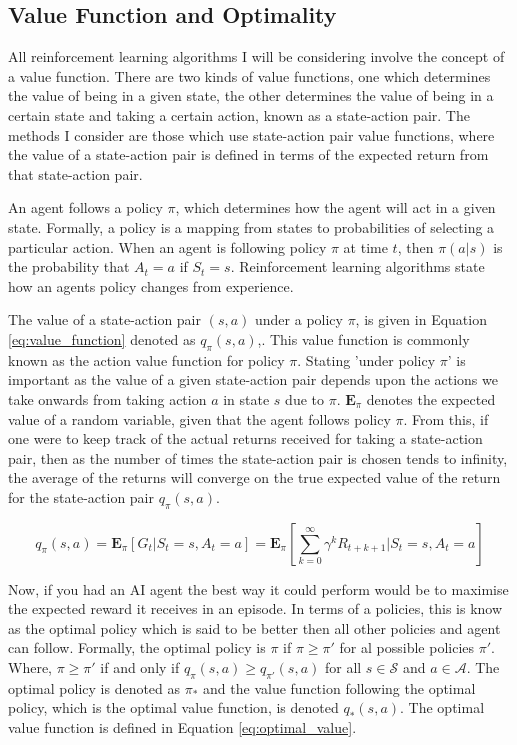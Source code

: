 \documentclass[../dissertation.tex]{subfiles}
\begin{document}
\subsection{Value Function and Optimality}
\label{sec:optimal_value}
All reinforcement learning algorithms I will be considering involve the concept of a value function. There are two kinds of value functions, one which determines the value of being in a given state, the other determines the value of being in a certain state and taking a certain action, known as a state-action pair. The methods I consider are those which use state-action pair value functions, where the value of a state-action pair is defined in terms of the expected return from that state-action pair.

An agent follows a policy $\pi$, which determines how the agent will act in a given state. Formally, a policy is a mapping from states to probabilities of selecting a particular action. When an agent is following policy $\pi$ at time $t$, then $\pi(a|s)$ is the probability that $A_t = a$ if $S_t = s$. Reinforcement learning algorithms state how an agents policy changes from experience. 

The value of a state-action pair $(s,a)$ under a policy $\pi$, is given in Equation \ref{eq:value_function} denoted as $q_\pi(s,a)$,. This value function is commonly known as the action value function for policy $\pi$. Stating 'under policy $\pi$' is important as the value of a given state-action pair depends upon the actions we take onwards from taking action $a$ in state $s$ due to $\pi$. $\mathbf{E}_\pi$ denotes the expected value of a random variable, given that the agent follows policy $\pi$. From this, if one were to keep track of the actual returns received for taking a state-action pair, then as the number of times the state-action pair is chosen tends to infinity, the average of the returns will converge on the true expected value of the return for the state-action pair $q_\pi(s,a)$.

\begin{equation}
\label{eq:value_function}
q_\pi(s, a) = \mathbf{E}_\pi[G_t | S_t = s, A_t = a] = \mathbf{E}_\pi [\sum_{k=0}^{\infty} \gamma^k R_{t+k+1} | S_t = s, A_t = a]
\end{equation}

Now, if you had an AI agent the best way it could perform would be to maximise the expected reward it receives in an episode. In terms of a policies, this is know as the optimal policy which is said to be better then all other policies and agent can follow. Formally, the optimal policy is $\pi$ if $\pi \geq \pi'$ for al possible policies $\pi'$. Where, $\pi \geq \pi'$ if and only if $q_\pi(s,a) \geq q_{\pi'}(s,a)$ for all $s \in \mathcal{S}$ and $a \in \mathcal{A}$. The optimal policy is denoted as $\pi_*$ and the value function following the optimal policy, which is the optimal value function, is denoted $q_*(s,a)$. The optimal value function is defined in Equation \ref{eq:optimal_value}.
\end{document}
